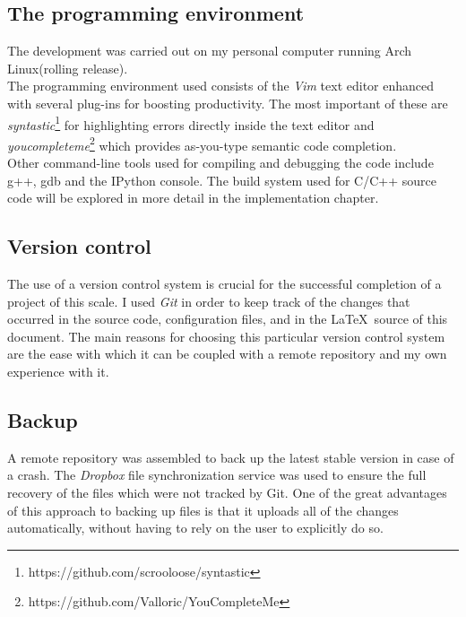 \documentclass[12pt,a4paper,twoside,openright]{report}
\begin{document}
\subsection{The programming environment}
The development was carried out on my personal computer running Arch Linux(rolling release).\\
The programming environment used consists of the \textit{Vim} text editor enhanced with several plug-ins for boosting productivity. The most important of these are \textit{syntastic}\footnote{https://github.com/scrooloose/syntastic} for highlighting errors directly inside the text editor and \textit{youcompleteme}\footnote{https://github.com/Valloric/YouCompleteMe} which provides as-you-type semantic code completion.\\
Other command-line tools used for compiling and debugging the code include g++, gdb and the IPython console. The build system used for C/C++ source code will be explored in more detail in the implementation chapter.

\subsection{Version control}
The use of a version control system is crucial for the successful completion of a project of this scale. I used \emph{Git} in order to keep track of the changes that occurred in the source code, configuration files, and in the \LaTeX\  source of this document. The main reasons for choosing this particular version control system are the ease with which it can be coupled with a remote repository and my own experience with it.

\subsection{Backup}
A remote repository was assembled to back up the latest stable version in case of a crash. The \emph{Dropbox} file synchronization service was used to ensure the full recovery of the files which were not tracked by Git. One of the great advantages of this approach to backing up files is that it uploads all of the changes automatically, without having to rely on the user to explicitly do so.  
\end{document}
